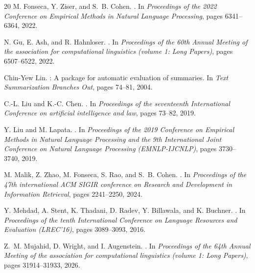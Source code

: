\documentclass[10pt,twocolumn,letterpaper]{article}
\begin{document}
{\begin{thebibliography}{20}
M. Fonseca, Y. Ziser, and S.~B. Cohen.
.
\newblock In \emph{Proceedings of the 2022 Conference on Empirical Methods in
  Natural Language Processing}, pages 6341--6364, 2022.

N. Gu, E. Ash, and R. Hahnloser.
.
\newblock In \emph{Proceedings of the 60th Annual Meeting of the association
  for computational linguistics (volume 1: Long Papers)}, pages 6507--6522,
  2022.

Chin-Yew Lin.
: A package for automatic evaluation of summaries.
\newblock In \emph{Text Summarization Branches Out}, pages 74--81, 2004.

C.-L. Liu and K.-C. Chen.
.
\newblock In \emph{Proceedings of the seventeenth International Conference on
  artificial intelligence and law}, pages 73--82, 2019.

Y. Liu and M. Lapata.
.
\newblock In \emph{Proceedings of the 2019 Conference on Empirical Methods in
  Natural Language Processing and the 9th International Joint Conference on
  Natural Language Processing (EMNLP-IJCNLP)}, pages 3730--3740, 2019.

M. Malik, Z. Zhao, M. Fonseca, S. Rao, and S.~B. Cohen.
.
\newblock In \emph{Proceedings of the 47th international ACM SIGIR conference
  on Research and Development in Information Retrieval}, pages 2241--2250,
  2024.

Y. Mehdad, A. Stent, K. Thadani, D. Radev, Y. Billawala, and K. Buchner.
.
\newblock In \emph{Proceedings of the tenth International Conference on
  Language Resources and Evaluation (LREC’16)}, pages 3089--3093, 2016.

Z.~M. Mujahid, D. Wright, and I. Augenstein.
.
\newblock In \emph{Proceedings of the 64th Annual Meeting of the association
  for computational linguistics (volume 1: Long Papers)}, pages 31914--31933,
  2026.


\end{thebibliography}}
\end{document}
